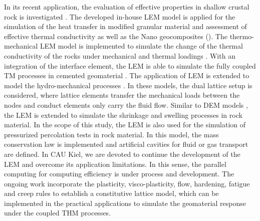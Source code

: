 In its recent application, the evaluation of effective properties in shallow crustal rock is investigated \cite{Rizvietal2019c}. The developed in-house LEM model is applied for the simulation of the heat transfer in modified granular material and assessment of effective thermal conductivity \cite{Rizvietal2020b, Rizvietal2018b, Rizvietal2016, Shresthaetal2019} as well as the Nano geocomposites (\cite{Rizvietal2019d}). The thermo-mechanical LEM model is implemented to simulate the change of the thermal conductivity of the rocks under mechanical and thermal loadings \cite{Sattarietal2017}. With an integration of the interface element, the LEM is able to simulate the fully coupled TM processes in cemented geomaterial \cite{Sattarietal2019b}. The application of LEM is extended to model the hydro-mechanical processes \cite{Grassl2009, Grassletal2013}. In these models, the dual lattice setup is considered, where lattice elements transfer the mechanical loads between the nodes and conduct elements only carry the fluid flow. Similar to DEM models \cite{Simaetal2013}, the LEM is extended to simulate the shrinkage and swelling processes in rock material. In the scope of this study, the LEM is also used for the simulation of pressurized percolation tests in rock material. In this model, the mass conservation law is implemented and artificial cavities for fluid or gas transport are defined. In CAU Kiel, we are devoted to continue the development of the LEM and overcome its application limitations. In this sense, the parallel computing for computing efficiency is under process and development. The ongoing work incorporate the plasticity, visco-plasticity, flow, hardening, fatigue and creep rules to establish a constitutive lattice model, which can be implemented in the practical applications to simulate the geomaterial response under the coupled THM processes.\\






